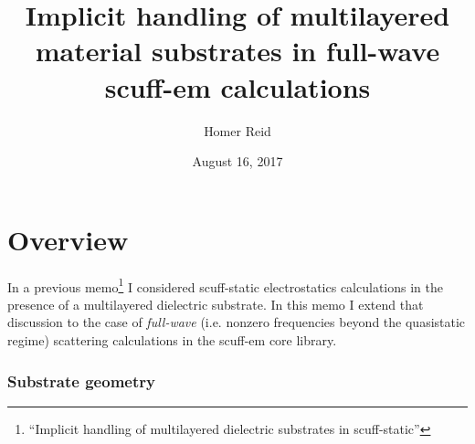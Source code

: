 \documentclass[letterpaper]{article}
\title {Implicit handling of multilayered material substrates
        in full-wave {\sc scuff-em} calculations
       }
\author {Homer Reid}
\date {August 16, 2017}
\begin{document}
\pagestyle{myheadings}

\maketitle

\tableofcontents

\newpage
\section{Overview}

In a 
previous memo\footnote{``Implicit handling of multilayered dielectric
substrates in {\sc scuff-static}''} I
considered {\sc scuff-static} electrostatics calculations
in the presence of a multilayered dielectric substrate.
In this memo I extend that discussion to the case of
\textit{full-wave} (i.e. nonzero frequencies beyond the
quasistatic regime) scattering calculations in the
{\sc scuff-em} core library.

\subsubsection*{Substrate geometry}
\end{document}
